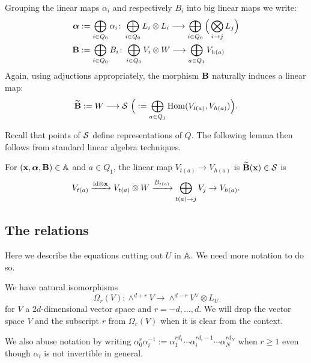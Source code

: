 \documentclass{amsart}
\newcommand{\balpha}{\boldsymbol{\alpha}}
\theoremstyle{definition}
\begin{document}
\begin{notation}
Grouping the linear maps $\alpha_i$ and respectively $B_i$ into big linear maps we write: 
\begin{align*}
\balpha &:= \bigoplus_{i\in Q_0} \alpha_i \colon \bigoplus_{i\in Q_0} L_i \otimes L_i \longrightarrow \bigoplus_{i \in Q_0} \Big( \bigotimes_{i \rightarrow j} L_j \Big) \\
\bfB &:= \bigoplus_{i\in Q_0} B_i \colon \bigoplus_{i\in Q_0} V_i \otimes W \longrightarrow \bigoplus_{a \in Q_1} V_{h(a)}
\end{align*}
Again, using adjuctions appropriately, the morphism $\mathbf{B}$ naturally induces a linear map:
$$\widetilde{\mathbf{B}} := W \longrightarrow \mathcal{S} \,\,\Big(:= \bigoplus_{a \in Q_1} \operatorname{Hom}(V_{t(a)}, V_{h(a)})\Big).$$
\end{notation}

Recall that points of $\mathcal{S}$ define representations of $Q$.
The following lemma then follows from standard linear algebra techniques.

\begin{lemma}\label{lem:Btilde}
For $(\bfx, \balpha, \bfB) \in \bA$ and $a \in Q_1$, the linear map $V_{t(a)} \rightarrow V_{h(a)}$ is $\widetilde{\mathbf{B}}(\mathbf{x}) \in \mathcal{S}$ is 
$$V_{t(a)} \xrightarrow{\textup{id} \otimes \mathbf{x}} V_{t(a)} \otimes W \xrightarrow{B_{t(a)}} \bigoplus_{t(a) \rightarrow j} V_j \rightarrow V_{h(a)}.$$
\end{lemma}

\subsection{The relations}
Here we describe the equations cutting out $U$ in $\mathbb{A}$.
We need more notation to do so.

\begin{notation}
We have natural isomorphisms
$$\Omega_r(V) \colon \wedge^{d+r} V \rightarrow \wedge^{d-r} V^\vee \otimes L_U$$ for $V$ a $2d$-dimensional vector space and $r= -d, \ldots, d$.
We will drop the vector space $V$ and the subscript $r$ from $\Omega_r(V)$ when it is clear from the context.

We also abuse notation by writing $\alpha_0^r \alpha_i^{-1} := \alpha_1^{rd_1} \cdots \alpha_i^{rd_i-1} \cdots \alpha_N^{rd_N}$ when $r\geq 1$ even though $\alpha_i$ is not invertible in general.
\end{notation}
\end{document}
